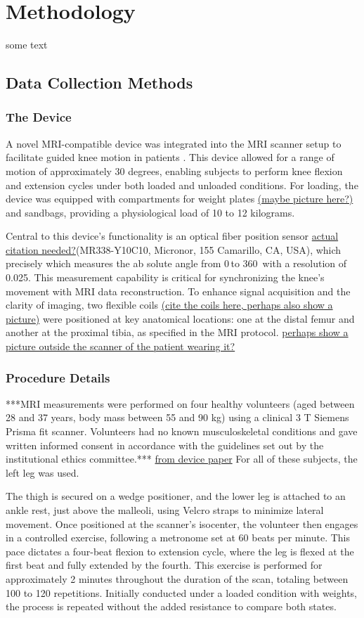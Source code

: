\documentclass{micro-econ-thesis}
\begin{document}
\section{Methodology}
\label{sec:second}
some text 
\subsection{Data Collection Methods}
\subsubsection{The Device}
A novel MRI-compatible device was integrated into the MRI scanner setup to facilitate guided knee motion in patients \parencite{brisson_novel_2022}. This device allowed for a range of motion of approximately 30 degrees, enabling subjects to perform knee flexion and extension cycles under both loaded and unloaded conditions. For loading, the device was equipped with compartments for weight plates \underline{(maybe picture here?)} and sandbags, providing a physiological load of 10 to 12 kilograms. 


Central to this device's functionality is an optical fiber position sensor \underline{actual citation needed?}(MR338-Y10C10, Micronor, 155 Camarillo, CA, USA), which precisely  which measures the ab­
solute angle from 0{\degree}\,to 360\degree \, with a resolution of 0.025\degree. This measurement capability is critical for synchronizing the knee's movement with MRI data reconstruction. To enhance signal acquisition and the clarity of imaging, two flexible coils \underline{(cite the coils here, perhaps also show a picture)} were positioned at key anatomical locations: one at the distal femur and another at the proximal tibia, as specified in the MRI protocol. \underline{perhaps show a picture outside the scanner of the patient wearing it? }

\subsubsection{Procedure Details}
***MRI measurements were performed on four healthy volunteers (aged between 28 and 37 years, body mass between 55 and 90 kg) using a clinical 3 T Siemens Prisma fit scanner. Volunteers had no known musculoskeletal conditions and gave written informed consent in accordance with the guidelines set out by the institutional ethics committee.*** \underline{from device paper} For all of these subjects, the left leg was used. 

The thigh is secured on a wedge positioner, and the lower leg is attached to an ankle rest, just above the malleoli, using Velcro straps to minimize lateral movement. Once positioned at the scanner's isocenter, the volunteer then engages in a controlled exercise, following a metronome set at 60 beats per minute. This pace dictates a four-beat flexion to extension cycle, where the leg is flexed at the first beat and fully extended by the fourth. This exercise is performed for approximately 2 minutes throughout the duration of the scan, totaling between 100 to 120 repetitions. Initially conducted under a loaded condition with weights, the process is repeated without the added resistance to compare both states.
\end{document}
